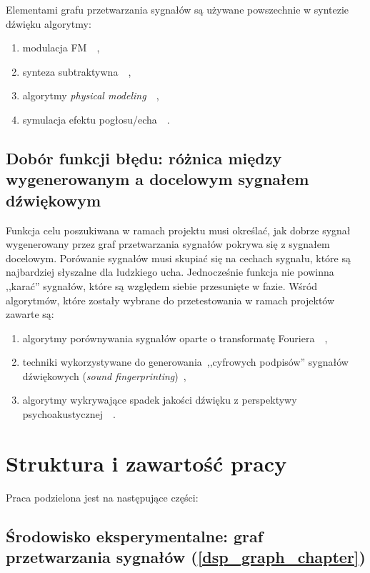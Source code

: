 Elementami grafu przetwarzania sygnałów są używane powszechnie w syntezie dźwięku algorytmy:

\begin{enumerate}
  \item modulacja FM~\cite{spectral_audio_processing}~\cite{computational_music_synthesis},
  \item synteza subtraktywna~\cite{computational_music_synthesis}~\cite{digital_filters},
  \item algorytmy \textit{physical modeling}~\cite{lisp_synthesis}~\cite{computational_music_synthesis},
  \item symulacja efektu pogłosu/echa~\cite{reverb}~\cite{freeverb}.
\end{enumerate}

\subsection{Dobór funkcji błędu: różnica między wygenerowanym a docelowym sygnałem dźwiękowym}

Funkcja celu poszukiwana w ramach projektu musi określać, jak dobrze sygnał wygenerowany przez
graf przetwarzania sygnałów pokrywa się z sygnałem docelowym. Porówanie sygnałów musi skupiać się
na cechach sygnału, które są najbardziej słyszalne dla ludzkiego ucha. Jednocześnie funkcja nie powinna
,,karać'' sygnałów, które są względem siebie przesunięte w fazie. Wśród algorytmów, które zostały wybrane
do przetestowania w ramach projektów zawarte są:

\begin{enumerate}
  \item algorytmy porównywania sygnałów oparte o transformatę Fouriera~\cite{sliding_fourier}~\cite{mfcc},
  \item techniki wykorzystywane do generowania~,,cyfrowych podpisów'' sygnałów dźwiękowych (\textit{sound fingerprinting})~\cite{computer_vision_music_identification},
  \item algorytmy wykrywające spadek jakości dźwięku z perspektywy psychoakustycznej~\cite{peaq}~\cite{frechet_audio_distance}.
\end{enumerate}

\section{Struktura i zawartość pracy}

Praca podzielona jest na następujące części:

\subsection*{Środowisko eksperymentalne: graf przetwarzania sygnałów (\ref{dsp_graph_chapter}) }

